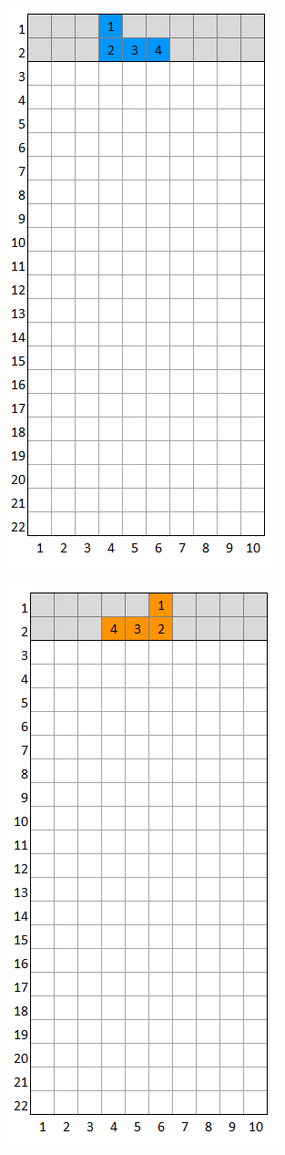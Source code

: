 \documentclass[a4paper]{article}
\begin{document}
	\begin{minipage}{0.25\textwidth}
		\centering
		\includegraphics[scale=0.4]{resources/img/minoes/mino_blue}
		\label{fig:mino-blue}
	\end{minipage}%
	\begin{minipage}{0.25\textwidth}
		\centering
		\includegraphics[scale=0.4]{resources/img/minoes/mino_orange}
		\label{fig:mino-orange}
	\end{minipage}%
\end{document}
